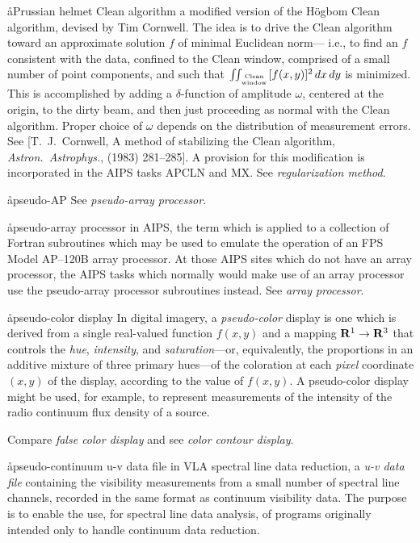 \aa{Prussian helmet Clean algorithm}
a modified version of the H\"ogbom Clean algorithm, devised by
Tim Cornwell.
The idea is to drive the Clean algorithm toward an approximate solution
$f$ of minimal Euclidean norm---%
i.e., to find an $f$ consistent with the data, confined to
the Clean window, comprised of a small number of point components,
and such that $\intii_{\operatorname{Clean}\atop\operatorname{window}}
[f(x,y)]^2\,dx\,dy$ is minimized.
This is accomplished by adding a $\delta$-function of amplitude
$\omega$, centered at the origin, to the dirty beam, and then just
proceeding as normal with the Clean algorithm.
Proper choice of $\omega$ depends on the
distribution of measurement errors.
See [T.~J.~Cornwell,
A method of stabilizing the Clean algorithm,
{\it Astron.\ Astrophys.},  (1983) 281--285].
A provision for this modification is incorporated in the AIPS tasks
APCLN and MX.
See {\it regularization method}.

\aa{pseudo-AP} See {\it pseudo-array processor}.

\aa{pseudo-array processor}
in AIPS, the term which is applied to a collection of
Fortran subroutines which may be used to emulate the operation
of an FPS Model AP--120B array processor.
At those AIPS sites which do not have an array processor,
the AIPS tasks which normally would make use of an
array processor use the pseudo-array processor subroutines instead.
See {\it array processor}.

\aa{pseudo-color display}
In digital imagery, a {\it pseudo-color} display
is one which is derived from a single real-valued function $f(x,y)$
and a mapping $\bold R^1\to\bold R^3$ that controls
the {\it hue}, {\it intensity}, and {\it saturation}---or,
equivalently, the proportions in an additive mixture of three
primary hues---of the coloration at each {\it pixel} coordinate $(x,y)$
of the display, according to the value of $f(x,y)$.
A pseudo-color display might be used, for example, to represent
measurements of the intensity of the radio continuum flux density
of a source.
\par
Compare {\it false color display} and see {\it color contour display}.

\aa{pseudo-continuum u-v data file}
in VLA spectral line data reduction, a {\it u-v data file}
containing the visibility measurements from a small
number of spectral line channels, recorded in the same format
as continuum visibility data.
The purpose is to enable the use, for spectral line data analysis,
of programs originally intended only to handle continuum
data reduction.

